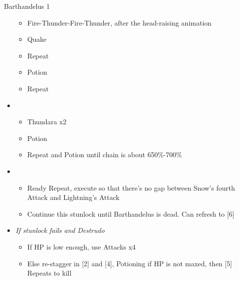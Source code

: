 \documentclass{report}
\begin{document}
\begin{battle}{Barthandelus 1}
\begin{itemize}
    \begin{itemize}
        \item Fire-Thunder-Fire-Thunder, after the head-raising animation
        \item Quake
        \item Repeat
        \item Potion
        \item Repeat
    \end{itemize}
    \item \fourth
    \begin{itemize}
        \item Thundara x2
        \item Potion
        \item Repeat and Potion until chain is about 650\%-700\%
    \end{itemize}
    \item \fifth
    \begin{itemize}
        \item Ready Repeat, execute so that there's no gap between Snow's fourth Attack and Lightning's Attack
        \item Continue this stunlock until Barthandelus is dead. Can refresh to [6]
    \end{itemize}
    \item \textit{If stunlock fails and Destrudo}
    \begin{itemize}
        \item If HP is low enough, use Attacks x4
        \item Else re-stagger in [2] and [4], Potioning if HP is not maxed, then [5] Repeats to kill
    \end{itemize}
\end{itemize}
\end{battle}
\end{document}
